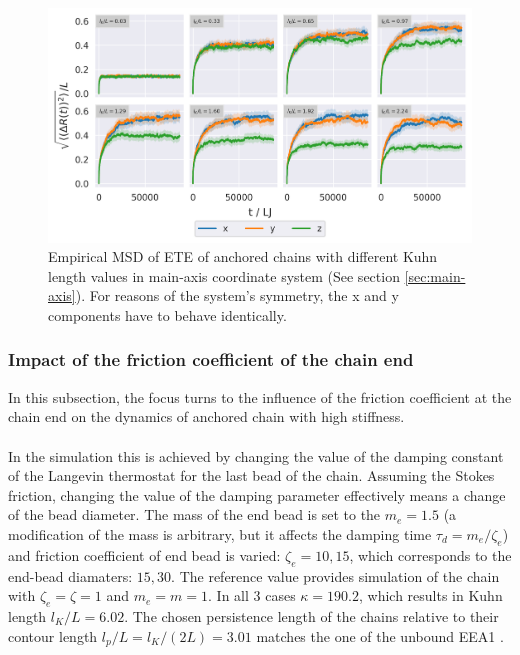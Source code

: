 \documentclass[
    paper=A4,pagesize=automedia,fontsize=12pt,
    BCOR=15mm,DIV=22,
    twoside,headinclude,footinclude=false,
    fleqn,             %
    bibliography=totocnumbered,          %
    listof=totoc,                %
    listof=flat,                 %
    cleardoublepage=empty      %
    numbers=endperiod
]{scrartcl}
\begin{document}
\begin{figure}
    \begin{center}
      \includegraphics[width=\columnwidth,trim={0cm 0cm 0cm 0.0cm},clip]{4-exp-msd_by_dim.png}
      \caption{\label{fig:msd_anchored_l_K_by_dim}
      Empirical MSD of ETE of anchored chains with different Kuhn length values in
      main-axis coordinate system (See section \ref{sec:main-axis}). For reasons of
      the system's symmetry, the x and y components have to behave identically.
      }
    \end{center}
\end{figure}

\FloatBarrier

\subsubsection{Impact of the friction coefficient of the chain end}
\label{sec:impact_of_zeta_e}
In this subsection, the focus turns to the influence 
of the friction coefficient at the chain end on the dynamics of anchored chain with high
stiffness.
\\
\\
In the simulation this is achieved by changing the value of the damping constant 
of the Langevin thermostat
for the last bead of the chain. Assuming the Stokes friction, 
changing the value of the damping parameter effectively means a change of the 
bead diameter. The mass of the end bead is set to the $m_e = 1.5$ 
(a modification of the mass is arbitrary, 
but it affects the damping time $\tau_d=m_e/\zeta_e$)
and friction coefficient of end bead
is varied: $\zeta_e = 10, 15$, which corresponds to the end-bead diamaters: $15, 30$.
The reference value provides simulation of the chain with $\zeta_e=\zeta=1$ and $m_e=m=1$.
In all 3 cases $\kappa=190.2$, which results in Kuhn length $l_K/L=6.02$. The chosen
persistence length of the chains relative to their contour length $l_p/L=l_K/(2L)=3.01$ matches
the one of the unbound EEA1 \cite{Singh:2022}.
\end{document}

